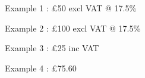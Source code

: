\documentclass[12pt]{scrartcl}
\makeatletter
\newcommand*{\cost}[2][excl VAT @ 17.5\%]{\pounds#2 #1}
\makeatother
\begin{document}
Example 1 : \cost{50}

Example 2 : \cost{100}

Example 3 : \cost[inc VAT]{25}

Example 4 : \cost[]{75.60}
\end{document}
